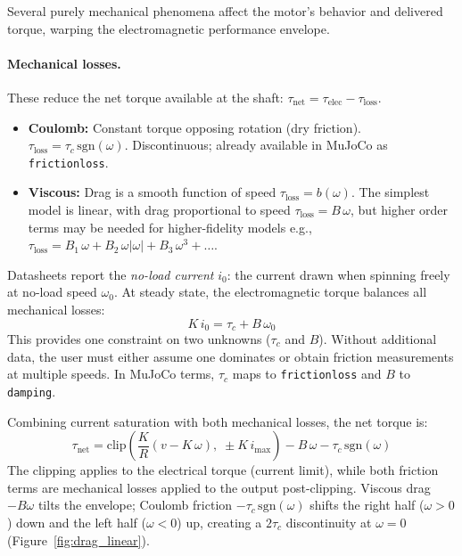 \documentclass[10pt, a4paper, twocolumn]{article}
\let\oldtexttt\texttt
\renewcommand{\texttt}[1]{{\smaller\oldtexttt{#1}}}
\begin{document}
Several purely mechanical phenomena affect the motor's behavior and delivered torque, warping the electromagnetic performance envelope.

\paragraph{Mechanical losses.}
These reduce the net torque available at the shaft: $\tau_{\text{net}} = \tau_{\text{elec}} - \tau_{\text{loss}}$.
\begin{itemize}
  \item \textbf{Coulomb:} Constant torque opposing rotation (dry friction).
    $\tau_{\text{loss}} = \tau_c \, \text{sgn}(\omega)$. Discontinuous; already available in MuJoCo as \texttt{frictionloss}.
  \item \textbf{Viscous:} Drag is a smooth function of speed $\tau_{\text{loss}} = b(\omega)$. The simplest model is linear, with drag proportional to speed $\tau_{\text{loss}} = B \, \omega$, but higher order terms may be needed for higher-fidelity models e.g., $\tau_{\text{loss}} = B_1 \, \omega + B_2 \, \omega |\omega| + B_3 \, \omega^3 + \dots$.
\end{itemize}

\noindent Datasheets report the \emph{no-load current} $i_0$: the current drawn when spinning freely at no-load speed $\omega_0$. At steady state, the electromagnetic torque balances all mechanical losses:
\begin{equation}
  K \, i_0 = \tau_c + B \, \omega_0
  \label{eq:noload}
\end{equation}
This provides one constraint on two unknowns ($\tau_c$ and $B$). Without additional data, the user must either assume one dominates or obtain friction measurements at multiple speeds. In MuJoCo terms, $\tau_c$ maps to \texttt{frictionloss} and $B$ to \texttt{damping}.

Combining current saturation with both mechanical losses, the net torque is:
\begin{equation*}
  \tau_{\text{net}} = \text{clip}\!\left( \frac{K}{R}(v - K \, \omega),\;
    \pm K\, i_{\max} \right) - B \, \omega - \tau_c \, \text{sgn}(\omega)
  \label{eq:net_torque}
\end{equation*}
The clipping applies to the electrical torque (current limit), while both friction terms are mechanical losses applied to the output post-clipping. Viscous drag $-B\omega$ tilts the envelope; Coulomb friction $-\tau_c\,\text{sgn}(\omega)$ shifts the right half ($\omega > 0$) down and the left half ($\omega < 0$) up, creating a $2\tau_c$ discontinuity at $\omega = 0$ (Figure~\ref{fig:drag_linear}).
\end{document}
